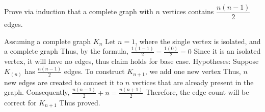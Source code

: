 \documentclass[addpoints]{exam}
\begin{document}
\begin{questions}
\question[5] Prove via induction that a complete graph with $n$ vertices contains $\dfrac{n(n-1)}{2}$ edges.
  \begin{solution}
    Assuming a complete graph $K_{n}$
    \newline Let $n=1$, where the single vertex is isolated, and a complete graph
    \newline Thus, by the formula, $\frac{1(1-1)}{2} = \frac{1(0)}{2} = 0$
    \newline Since it is an isolated vertex, it will have no edges, thus claim holds for base case.
    \newline 
    \newline Hypotheses: Suppose $K_(n)$ has $\frac{n(n-1)}{2}$ edges.
    \newline To construct $K_{n+1}$, we add one new vertex
    \newline Thus, $n$ new edges are created to connect it to $n$ vertices that are already present in the graph.
    \newline Consequently,
    \newline $\frac{n(n-1)}{2} + n = \frac{n(n+1)}{2}$
    \newline Therefore, the edge count will be correct for $K_{n+1}$
    \newline Thus proved.
  \end{solution}
  
\end{questions}
\end{document}
